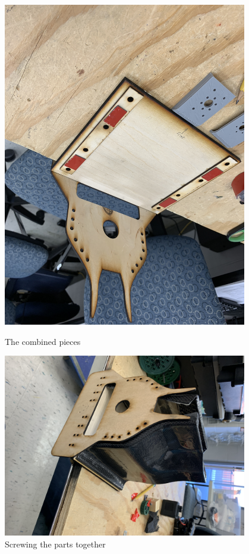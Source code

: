 \begin{figure}[ht]
\centering
\begin{minipage}[b]{.48\textwidth}
  \centering
  \includegraphics[width=0.95\textwidth]{Meetings/February/02-15-22/2-15-22_Hardware_Figure1 - Nathan Forrer.JPG}
  \caption{The combined pieces}
  \label{fig:021522_1}
\end{minipage}%
\hfill%
\begin{minipage}[b]{.48\textwidth}
  \centering
  \includegraphics[width=0.95\textwidth]{Meetings/February/02-15-22/2-15-22_Hardware_Figure2 - Nathan Forrer.JPG}
  \caption{Screwing the parts together}
  \label{fig:021522_2}
\end{minipage}
\end{figure}


